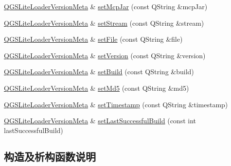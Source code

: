 \begin{DoxyCompactItemize}
\item 
\mbox{\hyperlink{class_q_g_s_lite_loader_version_meta}{Q\+G\+S\+Lite\+Loader\+Version\+Meta}} \& \mbox{\hyperlink{class_q_g_s_lite_loader_version_meta_a916bf909b4b76f0f55a6a90e05d00227}{set\+Mcp\+Jar}} (const Q\+String \&mcp\+Jar)
\item 
\mbox{\hyperlink{class_q_g_s_lite_loader_version_meta}{Q\+G\+S\+Lite\+Loader\+Version\+Meta}} \& \mbox{\hyperlink{class_q_g_s_lite_loader_version_meta_a9feecb8dc030b60ee2f331098b03accc}{set\+Stream}} (const Q\+String \&stream)
\item 
\mbox{\hyperlink{class_q_g_s_lite_loader_version_meta}{Q\+G\+S\+Lite\+Loader\+Version\+Meta}} \& \mbox{\hyperlink{class_q_g_s_lite_loader_version_meta_aaa34dfcced5617c669bfadd40abae31d}{set\+File}} (const Q\+String \&file)
\item 
\mbox{\hyperlink{class_q_g_s_lite_loader_version_meta}{Q\+G\+S\+Lite\+Loader\+Version\+Meta}} \& \mbox{\hyperlink{class_q_g_s_lite_loader_version_meta_a4938e169e2e45c356ac2bb4b68239841}{set\+Version}} (const Q\+String \&version)
\item 
\mbox{\hyperlink{class_q_g_s_lite_loader_version_meta}{Q\+G\+S\+Lite\+Loader\+Version\+Meta}} \& \mbox{\hyperlink{class_q_g_s_lite_loader_version_meta_a28ce28110e11b20457fd8b85eb9613ba}{set\+Build}} (const Q\+String \&build)
\item 
\mbox{\hyperlink{class_q_g_s_lite_loader_version_meta}{Q\+G\+S\+Lite\+Loader\+Version\+Meta}} \& \mbox{\hyperlink{class_q_g_s_lite_loader_version_meta_ad3ca0846e7a8478cf4d3fe479d5f56ef}{set\+Md5}} (const Q\+String \&md5)
\item 
\mbox{\hyperlink{class_q_g_s_lite_loader_version_meta}{Q\+G\+S\+Lite\+Loader\+Version\+Meta}} \& \mbox{\hyperlink{class_q_g_s_lite_loader_version_meta_aa0ce2a6e0d7edd79e7f296969c102232}{set\+Timestamp}} (const Q\+String \&timestamp)
\item 
\mbox{\hyperlink{class_q_g_s_lite_loader_version_meta}{Q\+G\+S\+Lite\+Loader\+Version\+Meta}} \& \mbox{\hyperlink{class_q_g_s_lite_loader_version_meta_ad9b0970016302dfee5598a309aa7962f}{set\+Last\+Successful\+Build}} (const int last\+Successful\+Build)
\end{DoxyCompactItemize}


\subsection{构造及析构函数说明}
\mbox{\label{class_q_g_s_lite_loader_version_meta_a75b5cec5745bb0d7bf6df272fda53ed1}} 
